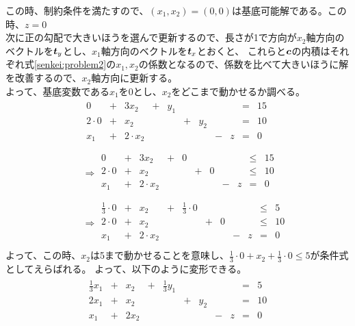 \documentclass[dvipdfmx,titlepage, a4paper]{jsarticle}%
\begin{document}
この時、制約条件を満たすので、$(x_{1}, x_{2}) = (0, 0)$は基底可能解である。この時、$z = 0$\\
次に正の勾配で大きいほうを選んで更新するので、長さが1で方向が$x_{2}$軸方向のベクトルを$\mbox{\boldmath $t$}_{y}$とし、$x_{1}$軸方向のベクトルを$\mbox{\boldmath $t$}_{x}$とおくと、
これらと$\mbox{\boldmath $c$}$の内積はそれぞれ式\eqref{senkei:problem2}の$x_{1}, x_{2}$の係数となるので、係数を比べて大きいほうに解を改善するので、$x_{2}$軸方向に更新する。\\
よって、基底変数である$x_{1}$を0とし、$x_{2}$をどこまで動かせるか調べる。
\begin{eqnarray*}
	&&\begin{array}{lllllllllll}
		0 & + & 3x_{2} & + & y_{1} & \;& \; &\; & \; & = & 15\\
		2 \cdot 0 & + & x_{2} & \; &\; & + & y_{2} &\; & \; & = & 10\\
		x_{1} & + & 2 \cdot x_{2} & \; &\; & \;& \; & - & z & = & 0\\
	\end{array}\\
	&&\Longrightarrow
	\begin{array}{lllllllllll}
		0 & + & 3x_{2} & + & 0 & \;& \; &\; & \; & \leq & 15\\
		2 \cdot 0 & + & x_{2} & \; &\; & + & 0 &\; & \; & \leq & 10\\
		x_{1} & + & 2 \cdot x_{2} & \; &\; & \;& \; & - & z & = & 0\\
	\end{array}\\
	&&\Longrightarrow
	\begin{array}{lllllllllll}
		\frac{1}{3} \cdot 0 & + & x_{2} & + & \frac{1}{3} \cdot 0 & \;& \; &\; & \; & \leq & 5\\
		2 \cdot 0 & + & x_{2} & \; &\; & + & 0 &\; & \; & \leq & 10\\
		x_{1} & + & 2 \cdot x_{2} & \; &\; & \;& \; & - & z & = & 0\\
	\end{array}
\end{eqnarray*}
よって、この時、$x_{2}$は5まで動かせることを意味し、$\frac{1}{3} \cdot 0 + x_{2} + \frac{1}{3} \cdot 0 \leq 5$が条件式としてえらばれる。
よって、以下のように変形できる。
\begin{eqnarray*}
	\begin{array}{lllllllllll}
		\frac{1}{3}x_{1} & + & x_{2} & + & \frac{1}{3} y_{1} & \;& \; &\; & \; & = & 5\\
		2x_{1} & + & x_{2} & \; &\; & + & y_{2} &\; & \; & = & 10\\
		x_{1} & + & 2x_{2} & \; &\; & \;& \; & - & z & = & 0\\
	\end{array}
\end{eqnarray*}
\end{document}
